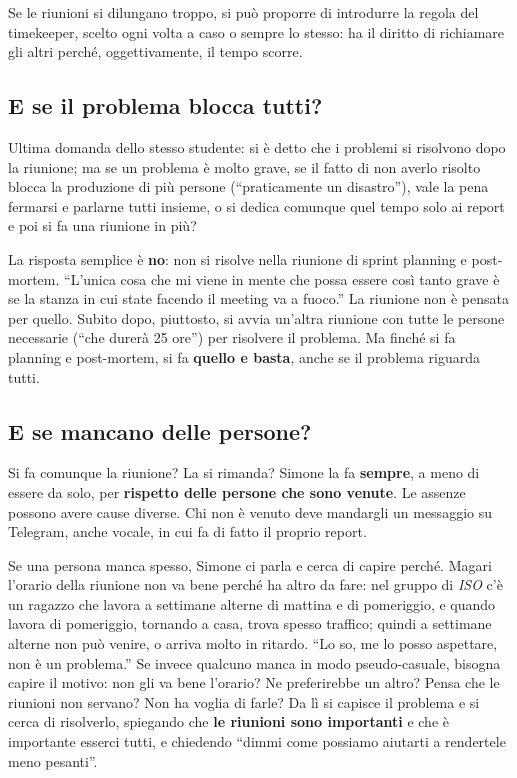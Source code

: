 Se le riunioni si dilungano troppo, si può proporre di introdurre la regola
del timekeeper, scelto ogni volta a caso o sempre lo stesso: ha il diritto di
richiamare gli altri perché, oggettivamente, il tempo scorre.

\subsection{E se il problema blocca tutti?}

Ultima domanda dello stesso studente: si è detto che i problemi si risolvono
dopo la riunione; ma se un problema è molto grave, se il fatto di non averlo
risolto blocca la produzione di più persone (``praticamente un disastro''),
vale la pena fermarsi e parlarne tutti insieme, o si dedica comunque quel
tempo solo ai report e poi si fa una riunione in più?

La risposta semplice è \textbf{no}: non si risolve nella riunione di sprint
planning e post-mortem. ``L'unica cosa che mi viene in mente che possa essere
così tanto grave è se la stanza in cui state facendo il meeting va a fuoco.''
La riunione non è pensata per quello. Subito dopo, piuttosto, si avvia
un'altra riunione con tutte le persone necessarie (``che durerà 25 ore'') per
risolvere il problema. Ma finché si fa planning e post-mortem, si fa
\textbf{quello e basta}, anche se il problema riguarda tutti.

\subsection{E se mancano delle persone?}

Si fa comunque la riunione? La si rimanda? Simone la fa \textbf{sempre}, a
meno di essere da solo, per \textbf{rispetto delle persone che sono venute}.
Le assenze possono avere cause diverse. Chi non è venuto deve mandargli un
messaggio su Telegram, anche vocale, in cui fa di fatto il proprio report.

Se una persona manca spesso, Simone ci parla e cerca di capire perché.
Magari l'orario della riunione non va bene perché ha altro da fare: nel
gruppo di \emph{ISO} c'è un ragazzo che lavora a settimane alterne di mattina
e di pomeriggio, e quando lavora di pomeriggio, tornando a casa, trova spesso
traffico; quindi a settimane alterne non può venire, o arriva molto in
ritardo. ``Lo so, me lo posso aspettare, non è un problema.'' Se invece
qualcuno manca in modo pseudo-casuale, bisogna capire il motivo: non gli va
bene l'orario? Ne preferirebbe un altro? Pensa che le riunioni non servano?
Non ha voglia di farle? Da lì si capisce il problema e si cerca di
risolverlo, spiegando che \textbf{le riunioni sono importanti} e che è
importante esserci tutti, e chiedendo ``dimmi come possiamo aiutarti a
rendertele meno pesanti''.

